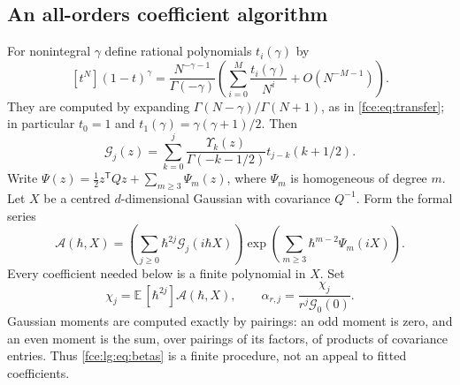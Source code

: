 \documentclass[11pt,a4paper]{article}
\numberwithin{equation}{section}
\theoremstyle{definition}\newtheorem{definition}[theorem]{Definition}
\theoremstyle{remark}\newtheorem{remark}[theorem]{Remark}
\newcommand{\Exp}{\mathbb E}
\begin{document}
\subsection{An all-orders coefficient algorithm}
For nonintegral $\gamma$ define rational polynomials $t_i(\gamma)$ by
\begin{equation}\label{fce:lg:eq:transfer}
 [t^N](1-t)^\gamma=
 \frac{N^{-\gamma-1}}{\Gamma(-\gamma)}
 \left(\sum_{i=0}^{M}\frac{t_i(\gamma)}{N^i}+O(N^{-M-1})\right).
\end{equation}
They are computed by expanding $\Gamma(N-\gamma)/\Gamma(N+1)$, as in
\eqref{fce:eq:transfer}; in particular $t_0=1$ and
$t_1(\gamma)=\gamma(\gamma+1)/2$. Then
\begin{equation}\label{fce:lg:eq:Gj}
 \mathcal G_j(z)=\sum_{k=0}^{j}
 \frac{\Upsilon_k(z)}{\Gamma(-k-1/2)}t_{j-k}(k+1/2).
\end{equation}
Write $\Psi(z)=\frac12z^{\mathsf T}Qz+\sum_{m\ge3}\Psi_m(z)$, where
$\Psi_m$ is homogeneous of degree $m$. Let $X$ be a centred
$d$-dimensional Gaussian with covariance $Q^{-1}$. Form the formal series
\begin{equation}\label{fce:lg:eq:wickseries}
 \mathscr A(\hbar,X)=
 \left(\sum_{j\ge0}\hbar^{2j}\mathcal G_j(i\hbar X)\right)
 \exp\!\left(\sum_{m\ge3}\hbar^{m-2}\Psi_m(iX)\right).
\end{equation}
Every coefficient needed below is a finite polynomial in $X$. Set
\begin{equation}\label{fce:lg:eq:betas}
 \chi_j=\Exp\,[\hbar^{2j}]\mathscr A(\hbar,X),\qquad
 \alpha_{r,j}=\frac{\chi_j}{r^j\mathcal G_0(0)}.
\end{equation}
Gaussian moments are computed exactly by pairings: an odd moment is zero,
and an even moment is the sum, over pairings of its factors, of products of
covariance entries. Thus \eqref{fce:lg:eq:betas} is a finite procedure, not
an appeal to fitted coefficients.
\end{document}
